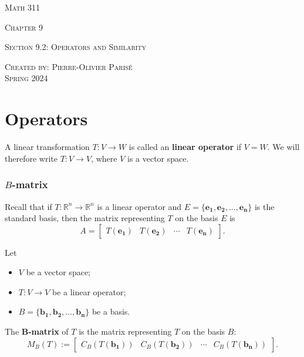 \documentclass[20pt,a4paper]{extarticle}
\newcommand{\ra}{\rightarrow}
\newcounter{definition}
\begin{document}
\thispagestyle{empty}

\begin{center}
\vspace*{0.75cm}

{\Huge \textsc{Math 311}}

\vspace*{1.5cm}

{\LARGE \textsc{Chapter 9}} 

\vspace*{0.75cm}

\noindent\textsc{Section 9.2: Operators and Similarity}

\vspace*{0.25cm}

\tableofcontents

\vfill

\noindent \textsc{Created by: Pierre-Olivier Paris{\'e}} \\
\textsc{Spring 2024}
\end{center}

\newpage

\section{Operators}

\begin{definition}
A linear transformation $T : V \ra W$ is called an \textbf{linear operator} if $V = W$. We will therefore write $T : V \ra V$, where $V$ is a vector space.
\end{definition}

\subsubsection{$B$-matrix}

Recall that if $T : \mathbb{R}^n \ra \mathbb{R}^n$ is a linear operator and $E = \{ \mathbf{e_1} , \mathbf{e_2} , \ldots , \mathbf{e_n} \}$ is the standard basis, then the matrix representing $T$ on the basis $E$ is
	\[
		A = \begin{bmatrix} T (\mathbf{e_1}) & T (\mathbf{e_2}) & \cdots & T (\mathbf{e_n}) \end{bmatrix} .
	\]

\begin{definition}
Let 
	\begin{itemize}
		\item $V$ be a vector space;
		\item $T : V \ra V$ be a linear operator;
		\item $B = \{ \mathbf{b_1} , \mathbf{b_2} , \ldots , \mathbf{b_n} \}$ be a basis.
	\end{itemize}
The \textbf{$\mathbf{B}$-matrix} of $T$ is the matrix representing $T$ on the basis $B$:
	\[
		M_B (T) := \begin{bmatrix} C_B (T (\mathbf{b_1})) & C_B (T (\mathbf{b_2})) & \cdots & C_B (T (\mathbf{b_n})) \end{bmatrix} .
	\]
\end{definition}
\end{document}
